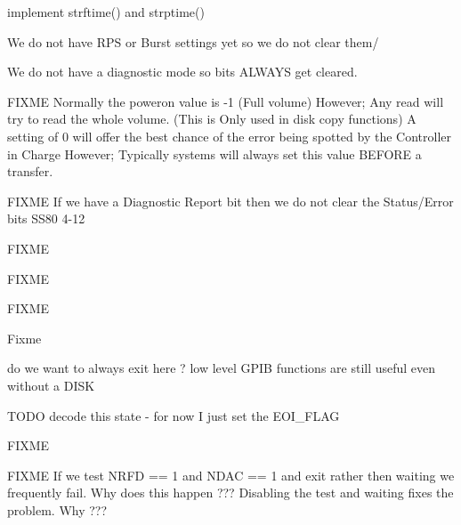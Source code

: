 
\begin{DoxyRefList}
\item[\label{todo__todo000001}%
\hypertarget{todo__todo000001}{}%
Global \hyperlink{time_8h_a7ffc52def0c7fbf70c50248e3f7d6a8a}{asctime\+\_\+r} (tm\+\_\+t $\ast$t, char $\ast$buf)]implement strftime() and strptime()  
\item[\label{todo__todo000046}%
\hypertarget{todo__todo000046}{}%
Global \hyperlink{ss80_8h_aa48ccb1479e226dacfaa1dac15631a9d}{Clear\+\_\+\+Common} (int u)]We do not have R\+PS or Burst settings yet so we do not clear them/ 

We do not have a diagnostic mode so bits A\+L\+W\+A\+YS get cleared. 

F\+I\+X\+ME Normally the poweron value is -\/1 (Full volume) However; Any read will try to read the whole volume. (This is Only used in disk copy functions) A setting of 0 will offer the best chance of the error being spotted by the Controller in Charge However; Typically systems will always set this value B\+E\+F\+O\+RE a transfer. 

F\+I\+X\+ME If we have a Diagnostic Report bit then we do not clear the Status/\+Error bits S\+S80 4-\/12  
\item[\label{todo__todo000053}%
\hypertarget{todo__todo000053}{}%
Global \hyperlink{fatfs__utils_8h_a97a2409a53057e1a63537f196ff00a50}{fatfs\+\_\+cat} (char $\ast$name)]F\+I\+X\+ME  
\item[\label{todo__todo000006}%
\hypertarget{todo__todo000006}{}%
Global \hyperlink{gpib__task_8h_ac63d4e431ab55dddfbf436d87135128e}{G\+P\+IB} (uint8\+\_\+t ch)]F\+I\+X\+ME 

F\+I\+X\+ME 

Fixme  
\item[\label{todo__todo000005}%
\hypertarget{todo__todo000005}{}%
Global \hyperlink{gpib__task_8h_a903eb44d83bf8f2db71e6f32a35fec62}{gpib\+\_\+error\+\_\+test} (uint16\+\_\+t val)]do we want to always exit here ? low level G\+P\+IB functions are still useful even without a D\+I\+SK  
\item[\label{todo__todo000004}%
\hypertarget{todo__todo000004}{}%
Global \hyperlink{gpib_8h_a67f7cdca85091b3eb0eea0051a200fbe}{gpib\+\_\+read\+\_\+str} (uint8\+\_\+t $\ast$buf, int size, uint16\+\_\+t $\ast$status)]T\+O\+DO decode this state -\/ for now I just set the E\+O\+I\+\_\+\+F\+L\+AG  
\item[\label{todo__todo000009}%
\hypertarget{todo__todo000009}{}%
Global \hyperlink{gpib__tests_8h_aed0c6a0a794f33d5cf7691c96d3e4955}{gpib\+\_\+tests} (char $\ast$str)]F\+I\+X\+ME  
\item[\label{todo__todo000002}%
\hypertarget{todo__todo000002}{}%
Global \hyperlink{gpib_8h_ac3d50cc1d56705d107e2f8fb00692e68}{gpib\+\_\+write\+\_\+byte} (uint16\+\_\+t ch)]F\+I\+X\+ME If we test N\+R\+FD == 1 and N\+D\+AC == 1 and exit rather then waiting we frequently fail. Why does this happen ??? Disabling the test and waiting fixes the problem. Why ??? 


\end{DoxyRefList}
